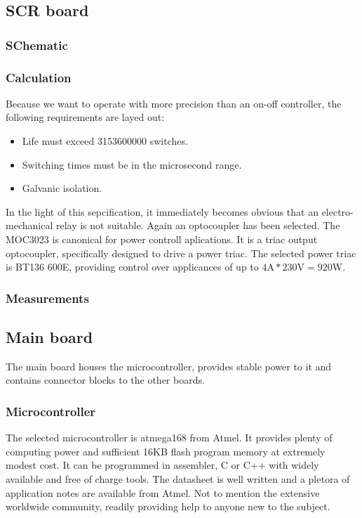 \subsection{SCR board}
\subsubsection{SChematic}

\subsubsection{Calculation}
Because we want to operate with more precision than an on-off controller, the following requirements are layed out:
\begin{itemize}
\item{Life must exceed 3153600000 switches.}
\item{Switching times must be in the microsecond range.}
\item{Galvanic isolation.}
\end{itemize}
In the light of this sepcification, it immediately becomes obvious that an electro-mechanical relay is not suitable.
Again an optocoupler has been selected.
The MOC3023 is canonical for power controll aplications.
It is a triac output optocoupler, specifically designed to drive a power triac.
The selected power triac is BT136 600E, providing control over applicances of up to $4\si{\ampere} * 230\si{\volt} = 920\si{\watt}$.

\subsubsection{Measurements}

\subsection{Main board}
The main board houses the microcontroller, provides stable power to it and contains connector blocks to the other boards.

\subsubsection{Microcontroller}
The selected microcontroller is atmega168 from Atmel.
It provides plenty of computing power and sufficient 16KB flash program memory at extremely modest cost.
It can be programmed in assembler, C or C++ with widely available and free of charge tools.
The datasheet is well written and a pletora of application notes are available from Atmel.
Not to mention the extensive worldwide community, readily providing help to anyone new to the subject.

